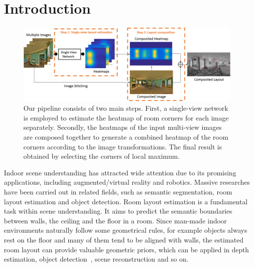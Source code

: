 \section{Introduction}

\begin{figure}
	\centering
	\includegraphics[width=\linewidth]{figs/ppline.png}
	\caption{Our pipeline consists of two main steps. First, a single-view network is employed to estimate the heatmap of room corners for each image separately. Secondly, the heatmaps of the input multi-view images are composed together to generate a combined heatmap of the room corners according to the image transformations. The final result is obtained by selecting the corners of local maximum.
		 }
	\label{fig:overview}
\end{figure}

Indoor scene understanding has attracted wide attention due to its promising applications, including augmented/virtual reality and robotics. Massive researches have been carried out in related fields, such as semantic segmentation, room layout estimation and object detection. 
Room layout estimation is a fundamental task within scene understanding. It aims to predict the semantic boundaries between walls, the ceiling and the floor in a room. 
Since man-made indoor environments naturally follow some geometrical rules, for example objects always rest on the floor and many of them tend to be aligned with walls, the estimated room layout can provide valuable geometric priors, which can be applied in depth estimation, object detection~\cite{hedau2010thinking}, scene reconstruction \cite{lee2017joint} and so on.


